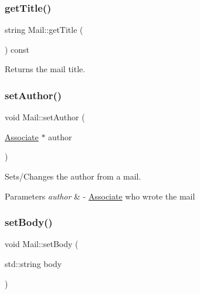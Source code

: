 \mbox{\label{classMail_aa51a6657dd3e594e8638ac4486660675}} 
\subsubsection{\texorpdfstring{get\+Title()}{getTitle()}}
{\footnotesize\ttfamily string Mail\+::get\+Title (\begin{DoxyParamCaption}{ }\end{DoxyParamCaption}) const}



Returns the mail title. 

\mbox{\label{classMail_acec00cbed8830746de97efeca4561dd8}} 
\subsubsection{\texorpdfstring{set\+Author()}{setAuthor()}}
{\footnotesize\ttfamily void Mail\+::set\+Author (\begin{DoxyParamCaption}\item[{\mbox{\hyperlink{classAssociate}{Associate}} $\ast$}]{author }\end{DoxyParamCaption})}



Sets/\+Changes the author from a mail. 


\begin{DoxyParams}{Parameters}
{\em author} & -\/ \mbox{\hyperlink{classAssociate}{Associate}} who wrote the mail \\
\hline
\end{DoxyParams}
\mbox{\label{classMail_a85ddf08af27648cc0835d66bd6b08dde}} 
\subsubsection{\texorpdfstring{set\+Body()}{setBody()}}
{\footnotesize\ttfamily void Mail\+::set\+Body (\begin{DoxyParamCaption}\item[{std\+::string}]{body }\end{DoxyParamCaption})}



